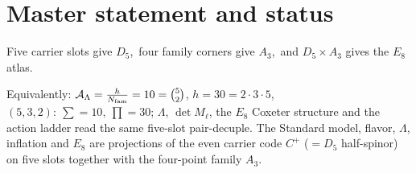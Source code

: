 \section*{Master statement and status}
\begin{keyeq}
Five carrier slots give $D_5$,\ four family corners give $A_3$,\ and $D_5\times A_3$ gives the $E_8$ atlas.
\end{keyeq}
\noindent Equivalently: $\mathcal A_\Lambda=\tfrac{h}{N_{\mathrm{fam}}}=10=\binom52$, $h=30=2\cdot3\cdot5$, $(5,3,2):\ \sum=10,\ \prod=30$;
$\Lambda$, $\det M_\ell$, the $E_8$ Coxeter structure and the action ladder read the same five-slot
pair-decuple. The Standard model, flavor, $\Lambda$, inflation and $E_8$ are projections of the
even carrier code $C^+$ ($=D_5$ half-spinor) on five slots together with the four-point family $A_3$.

